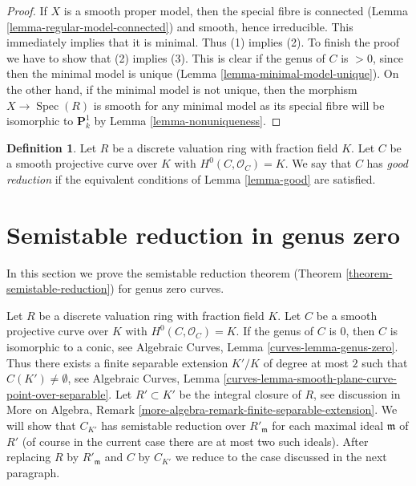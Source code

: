 \documentclass{stacks-project}
\theoremstyle{plain}
\theoremstyle{definition}
\newtheorem{definition}[subsection]{Definition}
\theoremstyle{remark}
\numberwithin{equation}{subsection}
\def\Spec{\mathop{\mathrm{Spec}}}
\begin{document}
\begin{proof}
If $X$ is a smooth proper model, then the special fibre is
connected (Lemma \ref{lemma-regular-model-connected})
and smooth, hence irreducible. This immediately implies that
it is minimal. Thus (1) implies (2). 
To finish the proof we have to show that (2) implies (3).
This is clear if the genus of $C$ is $> 0$, since then
the minimal model is unique (Lemma \ref{lemma-minimal-model-unique}).
On the other hand, if the minimal model is not unique, then
the morphism $X \to \Spec(R)$ is smooth for any minimal model
as its special fibre will be isomorphic to $\mathbf{P}^1_k$
by Lemma \ref{lemma-nonuniqueness}.
\end{proof}

\begin{definition}
\label{definition-good}
Let $R$ be a discrete valuation ring with fraction field $K$.
Let $C$ be a smooth projective curve over $K$ with $H^0(C, \mathcal{O}_C) = K$.
We say that $C$ has {\it good reduction} if the equivalent
conditions of Lemma \ref{lemma-good} are satisfied.
\end{definition}








\section{Semistable reduction in genus zero}
\label{section-semistable-reduction-genus-zero}

\noindent
In this section we prove the semistable reduction theorem
(Theorem \ref{theorem-semistable-reduction})
for genus zero curves.

\medskip\noindent
Let $R$ be a discrete valuation ring with fraction field $K$.
Let $C$ be a smooth projective curve over $K$ with $H^0(C, \mathcal{O}_C) = K$.
If the genus of $C$ is $0$, then $C$ is isomorphic to a conic,
see Algebraic Curves, Lemma \ref{curves-lemma-genus-zero}.
Thus there exists a finite separable extension $K'/K$ of
degree at most $2$ such that $C(K') \not = \emptyset$, see
Algebraic Curves, Lemma
\ref{curves-lemma-smooth-plane-curve-point-over-separable}.
Let $R' \subset K'$ be the integral closure of $R$, see
discussion in More on Algebra, Remark
\ref{more-algebra-remark-finite-separable-extension}.
We will show that $C_{K'}$ has semistable reduction
over $R'_{\mathfrak m}$ for each maximal ideal $\mathfrak m$ of $R'$
(of course in the current case there are at most two such ideals).
After replacing $R$ by $R'_{\mathfrak m}$ and $C$ by $C_{K'}$
we reduce to the case discussed in the next paragraph.
\end{document}
